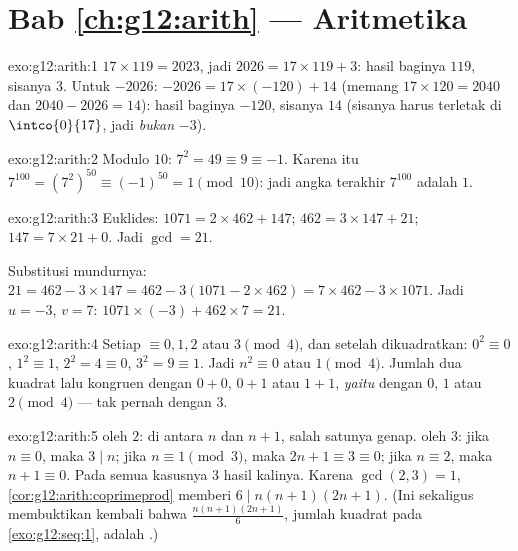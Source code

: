 \section*{Bab \ref{ch:g12:arith} --- Aritmetika}

\begin{solution}{exo:g12:arith:1}
$17 \times 119 = 2023$, jadi $2026 = 17 \times 119 + 3$: hasil baginya $119$,
sisanya $3$. Untuk $-2026$: $-2026 = 17\times(-120) + 14$ (memang
$17 \times 120 = 2040$ dan $2040 - 2026 = 14$): hasil baginya $-120$, sisanya
$14$ (sisanya harus terletak di $\intco{0}{17}$, jadi \emph{bukan} $-3$).
\end{solution}

\begin{solution}{exo:g12:arith:2}
Modulo $10$: $7^2 = 49 \equiv 9 \equiv -1$. Karena itu
$7^{100} = \left(7^2\right)^{50} \equiv (-1)^{50} = 1 \pmod{10}$: jadi angka
terakhir $7^{100}$ adalah $1$.
\end{solution}

\begin{solution}{exo:g12:arith:3}
Euklides: $1071 = 2\times462 + 147$; $462 = 3\times147 + 21$;
$147 = 7\times21 + 0$. Jadi $\gcd = 21$.

Substitusi mundurnya: $21 = 462 - 3\times147 = 462 - 3(1071 - 2\times462)
= 7\times462 - 3\times1071$. Jadi $u = -3$, $v = 7$:
$1071\times(-3) + 462\times7 = 21$.
\end{solution}

\begin{solution}{exo:g12:arith:4}
Setiap  $\equiv 0, 1, 2$ atau $3 \pmod 4$, dan setelah dikuadratkan:
$0^2 \equiv 0$, $1^2 \equiv 1$, $2^2 = 4 \equiv 0$, $3^2 = 9 \equiv 1$. Jadi
$n^2 \equiv 0$ atau $1 \pmod 4$. Jumlah dua kuadrat lalu kongruen dengan
$0 + 0$, $0 + 1$ atau $1 + 1$, \emph{yaitu} dengan $0$, $1$ atau $2 \pmod 4$ ---
tak pernah dengan $3$.
\end{solution}

\begin{solution}{exo:g12:arith:5}
 oleh $2$: di antara $n$ dan $n + 1$, salah satunya genap. 
oleh $3$: jika $n \equiv 0$, maka $3 \mid n$; jika $n \equiv 1 \pmod 3$, maka
$2n + 1 \equiv 3 \equiv 0$; jika $n \equiv 2$, maka $n + 1 \equiv 0$. Pada semua
kasusnya $3$  hasil kalinya. Karena $\gcd(2,3) = 1$,
\cref{cor:g12:arith:coprimeprod} memberi $6 \mid n(n+1)(2n+1)$.
(Ini sekaligus membuktikan kembali bahwa $\frac{n(n+1)(2n+1)}{6}$, jumlah kuadrat pada
\cref{exo:g12:seq:1}, adalah .)
\end{solution}

